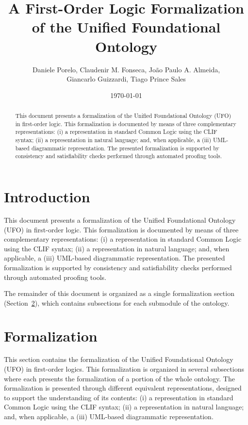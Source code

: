 \documentclass{article}
\title{A First-Order Logic Formalization of the Unified Foundational Ontology}
\author{
    Daniele Porelo,
    Claudenir M. Fonseca,
    Jo\~ao Paulo A. Almeida,\\
    Giancarlo Guizzardi,
    Tiago Prince Sales
}
\date{\today}
\begin{document}
\maketitle

\begin{abstract}
This document presents a formalization of the Unified Foundational Ontology (UFO) in first-order logic. This formalization is documented by means of three complementary representations: (i) a representation in standard Common Logic using the CLIF syntax; (ii) a representation in natural language; and, when applicable, a (iii) UML-based diagrammatic representation. The presented formalization is supported by consistency and satisfiability checks performed through automated proofing tools.
\end{abstract}

\section{Introduction}

This document presents a formalization of the Unified Foundational Ontology (UFO) in first-order logic. This formalization is documented by means of three complementary representations: (i) a representation in standard Common Logic using the CLIF syntax; (ii) a representation in natural language; and, when applicable, a (iii) UML-based diagrammatic representation. The presented formalization is supported by consistency and satisfiability checks performed through automated proofing tools.

The remainder of this document is organized as a single formalization section (Section~\ref{sec:formalization}), which contains subsections for each submodule of the ontology.

\section{Formalization}
\label{sec:formalization}

This section contains the formalization of the Unified Foundational Ontology (UFO) in first-order logics. This formalization is organized in several subsections where each presents the formalization of a portion of the whole ontology. The formalization is presented through different equivalent representations, designed to support the understanding of its contents: (i) a representation in standard Common Logic using the CLIF syntax; (ii) a representation in natural language; and, when applicable, a (iii) UML-based diagrammatic representation.
\end{document}
